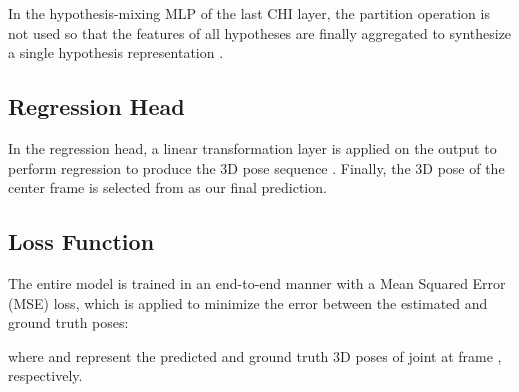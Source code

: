\documentclass[10pt,twocolumn,letterpaper]{article}
\begin{document}
In the hypothesis-mixing MLP of the last CHI layer, the partition operation is not used so that the features of all hypotheses are finally aggregated to synthesize a single hypothesis representation . 

\subsection{Regression Head}
In the regression head, a linear transformation layer is applied on the output  to perform regression to produce the 3D pose sequence . 
Finally, the 3D pose of the center frame  is selected from  as our final prediction. 

\subsection{Loss Function}
The entire model is trained in an end-to-end manner with a Mean Squared Error (MSE) loss,  
which is applied to minimize the error between the estimated and ground truth poses:

where  and  represent the predicted and ground truth 3D poses of joint  at frame , respectively. 
\end{document}
